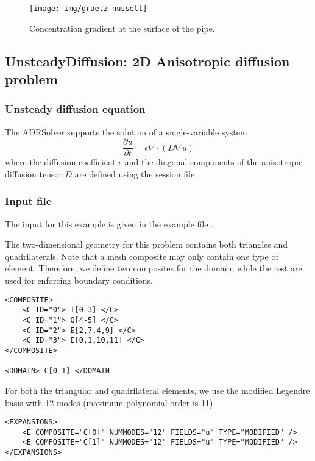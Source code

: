 \begin{figure}[h!]
\begin{center}
\texttt{[image: img/graetz-nusselt]}
\caption{Concentration gradient at the surface of the pipe.}
\label{f:adrsolver:masstransport}
\end{center}
\end{figure}


\subsection{UnsteadyDiffusion: 2D Anisotropic diffusion problem}

\subsubsection{Unsteady diffusion equation}
The ADRSolver supports the solution of a single-variable system
\[
  \frac{\partial u}{\partial t} = \epsilon \nabla \cdot ( D \nabla u)
\]
where the diffusion coefficient $\epsilon$ and the diagonal components of the anisotropic 
diffusion tensor $D$ are defined using the session file.

\subsubsection{Input file}
The input for this example is given in the example file .

The two-dimensional geometry for this problem contains both
triangles and quadrilaterals. Note that a mesh composite may only contain one type of
element. Therefore, we define two composites for the domain, while the rest are used for
enforcing boundary conditions.
\begin{lstlisting}[style=XMLStyle]
<COMPOSITE>
    <C ID="0"> T[0-3] </C>
    <C ID="1"> Q[4-5] </C>
    <C ID="2"> E[2,7,4,9] </C>
    <C ID="3"> E[0,1,10,11] </C>
</COMPOSITE>

<DOMAIN> C[0-1] </DOMAIN
\end{lstlisting}

For both the triangular and quadrilateral elements, we use the modified Legendre basis
with 12 modes (maximum polynomial order is 11).
\begin{lstlisting}[style=XMLStyle]
<EXPANSIONS>
    <E COMPOSITE="C[0]" NUMMODES="12" FIELDS="u" TYPE="MODIFIED" />
    <E COMPOSITE="C[1]" NUMMODES="12" FIELDS="u" TYPE="MODIFIED" />
</EXPANSIONS>
\end{lstlisting}

